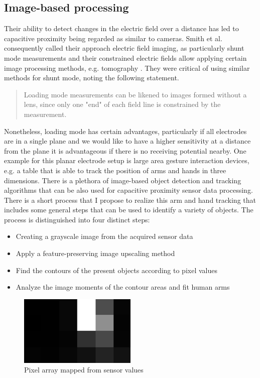 \subsection{Image-based processing}
Their ability to detect changes in the electric field over a distance has led to capacitive proximity being regarded as similar to cameras. Smith et al. consequently called their approach electric field imaging, as particularly shunt mode measurements and their constrained electric fields allow applying certain image processing methods, e.g. tomography \cite{Smith1999a}. They were critical of using similar methods for shunt mode, noting the following statement.
\begin{quote}
Loading mode measurements can be likened
to images formed without a lens, since only one "end" of
each field line is constrained by the measurement. \cite{smith1998electric}
\end{quote}
Nonetheless, loading mode has certain advantages, particularly if all electrodes are in a single plane and we would like to have a higher sensitivity at a distance from the plane it is advantageous if there is no receiving potential nearby. One example for this planar electrode setup is large area gesture interaction devices, e.g. a table that is able to track the position of arms and hands in three dimensions. There is a plethora of image-based object detection and tracking algorithms that can be also used for capacitive proximity sensor data processing. There is a short process that I propose to realize this arm and hand tracking that includes some general steps that can be used to identify a variety of objects. The process is distinguished into four distinct steps:
\begin{itemize}
\item Creating a grayscale image from the acquired sensor data
\item Apply a feature-preserving image upscaling method
\item Find the contours of the present objects according to pixel values
\item Analyze the image moments of the contour areas and fit human arms
\end{itemize} 

\begin{figure}[h]
\centering
\includegraphics[width=0.5\textwidth]{images/proc_im_pixels}
\caption{Pixel array mapped from sensor values}
\label{fig:proc_im_pixels}
\end{figure}

